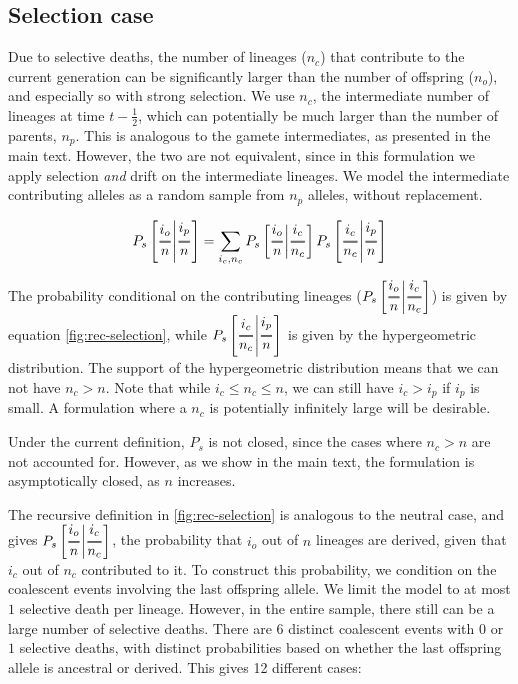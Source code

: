 \documentclass[review]{elsarticle}
\newcommand{\Dfrac}[2]{%
  \ooalign{%
    $\genfrac{}{}{1.2pt}0{#1}{#2}$\cr%
    $\color{white}\genfrac{}{}{.4pt}0{\phantom{#1}}{\phantom{#2}}$}%
}
\newcommand{\cond}{\middle\vert}
\begin{document}
\subsection{Selection case}

Due to selective deaths, the number of lineages ($n_c$) that contribute to the current generation
can be significantly larger than the number of offspring ($n_o$), and especially so with strong
selection. We use $n_c$, the intermediate number of lineages at time $t-\frac{1}{2}$, which can
potentially be much larger than the number of parents, $n_p$. This is analogous to the gamete
intermediates, as presented in the main text. However, the two are not equivalent, since in this
formulation we apply selection \emph{and} drift on the intermediate lineages. We model the
intermediate contributing alleles as a random sample from $n_p$ alleles, without replacement.

\begin{equation}
  P_s\left[ \Dfrac{i_o}{n} \cond \Dfrac{i_p}{n} \right] = \sum_{i_c,n_c}P_s\left[ \Dfrac{i_o}{n}
    \cond \Dfrac{i_c}{n_c} \right] P_s\left[ \Dfrac{i_c}{n_c} \cond \Dfrac{i_p}{n} \right]
\end{equation}

The probability conditional on the contributing lineages
($P_s\left[ \Dfrac{i_o}{n} \cond \Dfrac{i_c}{n_c} \right]$) is given by equation
\ref{fig:rec-selection}, while $P_s\left[ \Dfrac{i_c}{n_c} \cond \Dfrac{i_p}{n} \right]$ is given by
the hypergeometric distribution. The support of the hypergeometric distribution means that we can
not have $n_c>n$. Note that while $i_c \le n_c \le n$, we can still have $i_c>i_p$ if $i_p$ is
small. A formulation where a $n_c$ is potentially infinitely large will be desirable.

Under the current definition, $P_s$ is not closed, since the cases where $n_c>n$ are not accounted
for. However, as we show in the main text, the formulation is asymptotically closed, as $n$ increases.

The recursive definition in \ref{fig:rec-selection} is analogous to the neutral case, and gives
$P_s\left[ \Dfrac{i_o}{n} \cond \Dfrac{i_c}{n_c} \right]$, the probability that $i_o$ out of $n$
lineages are derived, given that $i_c$ out of $n_c$ contributed to it. To construct this
probability, we condition on the coalescent events involving the last offspring allele. We limit the
model to at most $1$ selective death per lineage. However, in the entire sample, there still can be
a large number of selective deaths. There are 6 distinct coalescent events with $0$ or $1$ selective
deaths, with distinct probabilities based on whether the last offspring allele is ancestral or
derived. This gives 12 different cases:
\end{document}
